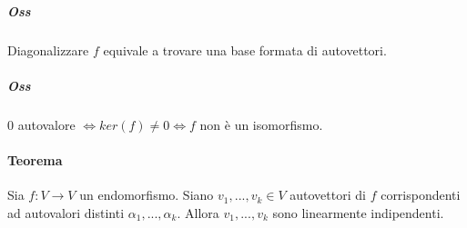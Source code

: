 \documentclass[a4paper,10pt]{article}
\begin{document}
\subparagraph{Oss} Diagonalizzare $f$ equivale a trovare una base formata di
autovettori.

\subparagraph{Oss} $0$ autovalore $\Leftrightarrow ker\left(f\right) \neq 0
\Leftrightarrow f$ non è un isomorfismo.

\paragraph{Teorema} Sia $f: V \rightarrow V$ un endomorfismo. Siano $v_1, ...,
v_k \in V$ autovettori di $f$ corrispondenti ad autovalori distinti $\alpha_1,
..., \alpha_k$. Allora $v_1, ..., v_k$ sono linearmente indipendenti.
\end{document}

